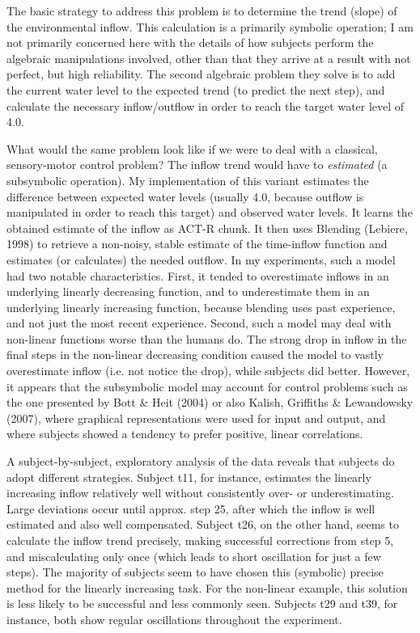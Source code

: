 \documentclass[twocolumn]{article}
\begin{document}
The basic strategy to address this problem is to determine the trend (slope) of the environmental inflow.  This calculation is a primarily symbolic operation; I am not primarily concerned here with the details of how subjects perform the algebraic manipulations involved, other than that they arrive at a result with not perfect, but high reliability.  The second algebraic problem they solve is to add the current water level to the expected trend (to predict the next step), and calculate the necessary inflow/outflow in order to reach the target water level of 4.0.

What would the same problem look like if we were to deal with a classical, sensory-motor control problem?  The inflow trend would have to \emph{estimated} (a subsymbolic operation).  My implementation of this variant estimates the difference between expected water levels (usually 4.0, because outflow is manipulated in order to reach this target) and observed water levels.  It learns the obtained estimate of the inflow as ACT-R chunk.  It then uses Blending (Lebiere, 1998) to retrieve a non-noisy, stable estimate of the time-inflow function and estimates (or calculates) the needed outflow.  In my experiments, such a model had two notable characteristics.  First, it tended to overestimate inflows in an underlying linearly decreasing function, and to underestimate them in an underlying linearly increasing function, because blending uses past experience, and not just the most recent experience.  Second, such a model may deal with non-linear functions worse than the humans do. The strong drop in inflow in the final steps in the non-linear decreasing condition caused the model to vastly overestimate inflow (i.e. not notice the drop), while subjects did better.  However, it appears that the subsymbolic model may account for control problems such as the one presented by Bott \& Heit (2004) or also Kalish, Griffiths \& Lewandowsky (2007), where graphical representations were used for input and output, and where subjects showed a tendency to prefer positive, linear correlations.

A subject-by-subject, exploratory analysis of the data reveals that subjects do adopt different strategies.  Subject t11, for instance, estimates the linearly increasing inflow relatively well without consistently over- or underestimating.  Large deviations occur until approx. step 25, after which the inflow is well estimated and also well compensated.   Subject t26, on the other hand, seems to calculate the inflow trend precisely, making successful corrections from step 5, and miscalculating only once (which leads to short oscillation for just a few steps).  The majority of subjects seem to have chosen this (symbolic) precise method for the linearly increasing task.  For the non-linear example, this solution is less likely to be successful and less commonly seen.  Subjects t29 and t39, for instance, both show regular oscillations throughout the experiment.
\end{document}
